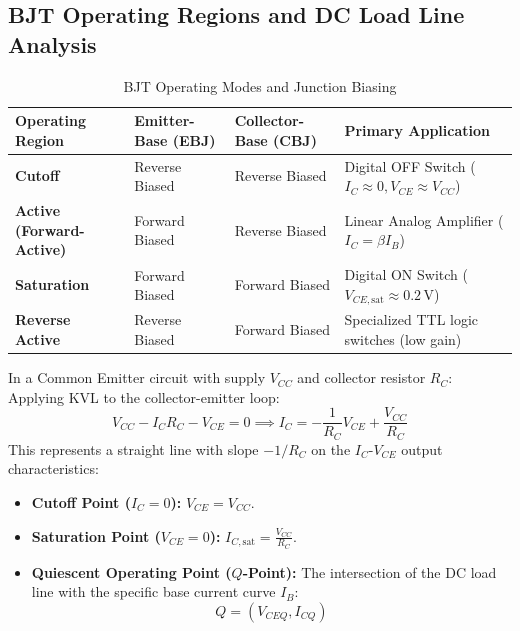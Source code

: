 \subsection{BJT Operating Regions and DC Load Line Analysis}
\begin{table}[htbp]
\centering
\small
\caption{BJT Operating Modes and Junction Biasing}
\label{tab:bjt_modes}
\begin{tabularx}{\textwidth}{lXXX}
\toprule
\textbf{Operating Region} & \textbf{Emitter-Base (EBJ)} & \textbf{Collector-Base (CBJ)} & \textbf{Primary Application} \\
\midrule
\textbf{Cutoff} & Reverse Biased & Reverse Biased & Digital OFF Switch ($I_C \approx 0, V_{CE} \approx V_{CC}$) \\
\textbf{Active (Forward-Active)} & Forward Biased & Reverse Biased & Linear Analog Amplifier ($I_C = \beta I_B$) \\
\textbf{Saturation} & Forward Biased & Forward Biased & Digital ON Switch ($V_{CE,\text{sat}} \approx 0.2\,\text{V}$) \\
\textbf{Reverse Active} & Reverse Biased & Forward Biased & Specialized TTL logic switches (low gain) \\
\bottomrule
\end{tabularx}
\end{table}

\begin{derivationbox}
In a Common Emitter circuit with supply $V_{CC}$ and collector resistor $R_C$:
Applying KVL to the collector-emitter loop:
\begin{equation}
    V_{CC} - I_C R_C - V_{CE} = 0 \implies I_C = -\frac{1}{R_C} V_{CE} + \frac{V_{CC}}{R_C}
\end{equation}
This represents a straight line with slope $-1/R_C$ on the $I_C$-$V_{CE}$ output characteristics:
\begin{itemize}
    \item \textbf{Cutoff Point ($I_C = 0$):} $V_{CE} = V_{CC}$.
    \item \textbf{Saturation Point ($V_{CE} = 0$):} $I_{C,\text{sat}} = \frac{V_{CC}}{R_C}$.
    \item \textbf{Quiescent Operating Point ($Q$-Point):} The intersection of the DC load line with the specific base current curve $I_B$:
    \begin{equation}
        Q = (V_{CEQ}, I_{CQ})
    \end{equation}
\end{itemize}
\end{derivationbox}

